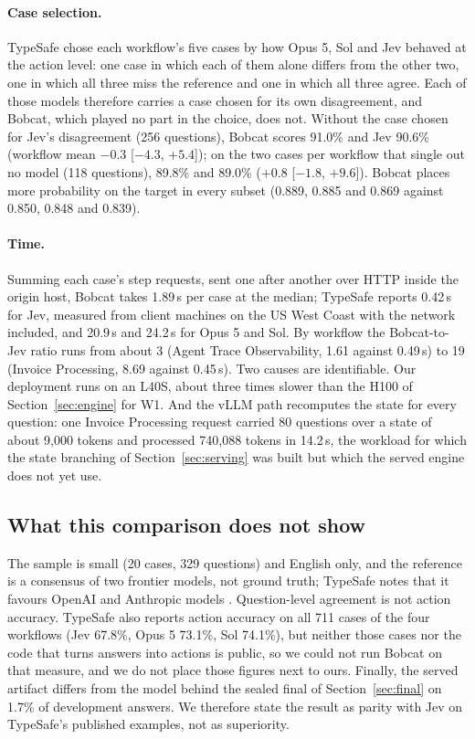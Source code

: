 \paragraph{Case selection.}
TypeSafe chose each workflow's five cases by how Opus 5, Sol and Jev behaved at the action
level: one case in which each of them alone differs from the other two, one in which all
three miss the reference and one in which all three agree. Each of those models therefore
carries a case chosen for its own disagreement, and Bobcat, which played no part in the
choice, does not. Without the case chosen for Jev's disagreement (256 questions), Bobcat
scores 91.0\% and Jev 90.6\% (workflow mean $-0.3$ [$-4.3$, $+5.4$]); on the two cases per
workflow that single out no model (118 questions), 89.8\% and 89.0\% ($+0.8$ [$-1.8$,
$+9.6$]). Bobcat places more probability on the target in every subset (0.889, 0.885 and
0.869 against 0.850, 0.848 and 0.839).

\paragraph{Time.}
Summing each case's step requests, sent one after another
over HTTP inside the origin host, Bobcat takes 1.89\,s per case at the median; TypeSafe
reports 0.42\,s for Jev, measured from client machines on the US West Coast with the network
included, and 20.9\,s and 24.2\,s for Opus 5 and Sol. By workflow the Bobcat-to-Jev ratio runs
from about 3 (Agent Trace Observability, 1.61 against 0.49\,s) to 19 (Invoice Processing,
8.69 against 0.45\,s). Two causes are identifiable. Our deployment runs on an L40S, about three
times slower than the H100 of Section~\ref{sec:engine} for W1. And the vLLM path recomputes
the state for every question: one Invoice Processing request carried 80 questions over a
state of about 9,000 tokens and processed 740,088 tokens in 14.2\,s, the workload for which
the state branching of Section~\ref{sec:serving} was built but which the served engine does
not yet use.

\subsection{What this comparison does not show}

The sample is small (20 cases, 329 questions) and English only, and the reference is a
consensus of two frontier models, not ground truth; TypeSafe notes that it favours OpenAI and
Anthropic models \citep{typesafe_blog}. Question-level agreement is not action accuracy.
TypeSafe also reports action accuracy on all 711 cases of the four workflows (Jev 67.8\%,
Opus 5 73.1\%, Sol 74.1\%), but neither those cases nor the code that turns answers into actions
is public, so we could not run Bobcat on that measure, and we do not place those figures next
to ours. Finally, the served artifact differs from the model behind the sealed final of
Section~\ref{sec:final} on 1.7\% of development answers. We therefore state the result as
parity with Jev on TypeSafe's published examples, not as superiority.
